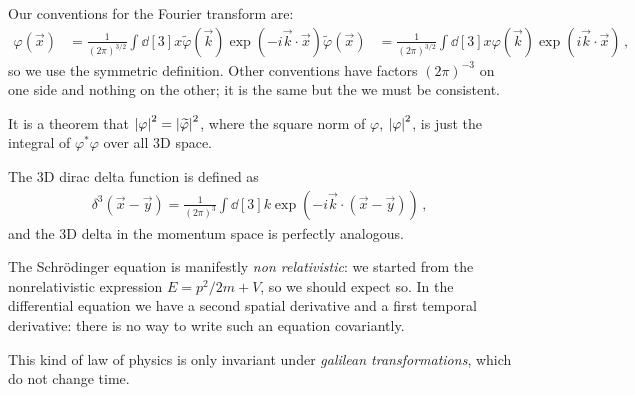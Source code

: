 \documentclass[main.tex]{subfiles}
\begin{document}
Our conventions for the Fourier transform are:
%
\begin{align}
\varphi (\vec{x}) &= \frac{1}{(2\pi )^{3/2}} \int \dd[3]{x} \widetilde{\varphi} (\vec{k}) \exp(-i \vec{k}\cdot \vec{x})
\widetilde{\varphi} (\vec{x}) &= \frac{1}{(2\pi )^{3/2}} \int \dd[3]{x} \varphi (\vec{k}) \exp(i \vec{k}\cdot \vec{x})
\,,
\end{align}
%
so we use the symmetric definition. Other conventions have factors \((2\pi )^{-3}\) on one side and nothing on the other; it is the same but the we must be consistent. 

It is a theorem that \(\abs{\varphi }^2 = \abs{\widetilde{\varphi}}^2\), where the square norm of \(\varphi \), \(\abs{\varphi}^2\), is just the integral of \(\varphi^{*} \varphi \) over all 3D space. 

The 3D dirac delta function is defined as 
%
\begin{align}
\delta^{3 } (\vec{x} - \vec{y}) = \frac{1}{(2\pi )^3}
\int \dd[3]{k} \exp(- i \vec{k} \cdot (\vec{x} - \vec{y}))
\,,
\end{align}
%
and the 3D delta in the momentum space is perfectly analogous. 

The Schrödinger equation is manifestly \emph{non relativistic}: we started from the nonrelativistic expression \(E = p^2/2m + V\), so we should expect so. 
In the differential equation we have a second spatial derivative and a first temporal derivative: there is no way to write such an equation  covariantly. 

This kind of law of physics is only invariant under \emph{galilean transformations}, which do not change time. 
\end{document}
